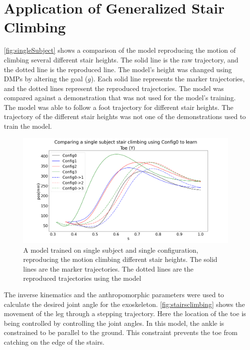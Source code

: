 \section{Application of Generalized Stair Climbing}


\autoref{fig:singleSubject} shows a comparison of the model reproducing the motion of climbing several different stair heights. The solid line is the raw trajectory, and the dotted line is the reproduced line. The model's height was changed using DMPs by altering the goal ($g$). Each solid line represents the marker trajectories, and the dotted lines represent the reproduced trajectories. The model was compared against a demonstration that was not used for the model's training. The model was able to follow a foot trajectory for different stair heights. The trajectory of the different stair heights was not one of the demonstrations used to train the model.

\begin{figure}[h]
    \centering
    \includegraphics[scale=0.3]{images/stairs/compareHeihgts.png}
    \caption[Reproducing the Motion Climbing Different]{A model trained on single subject and single configuration, reproducing the motion climbing different stair heights. The solid lines are the marker trajectories. The dotted lines are the reproduced trajectories using the model}
    \label{fig:singleSubject}
\end{figure}

The inverse kinematics and the anthropomorphic parameters were used to calculate the desired joint angle for the exoskeleton. \autoref{fig:stairsclimbing} shows the movement of the leg through a stepping trajectory. Here the location of the toe is being controlled by controlling the joint angles. In this model, the ankle is constrained to be parallel to the ground. This constraint prevents the toe from catching on the edge of the stairs.


